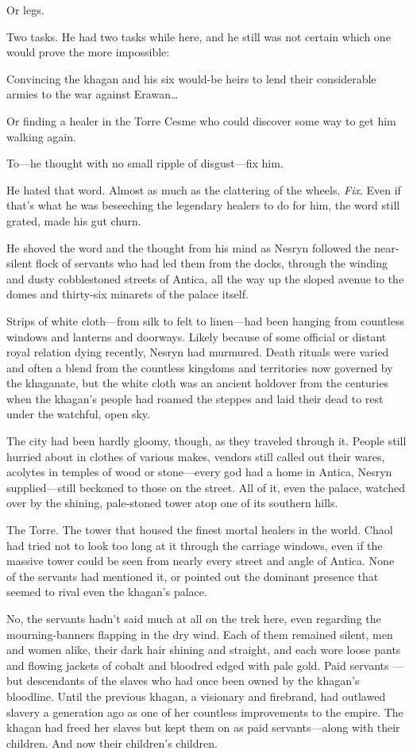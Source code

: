 Or legs.

Two tasks. He had two tasks while here, and he still was not certain which one would prove the more impossible:

Convincing the khagan and his six would-be heirs to lend their considerable armies to the war against Erawan\ldots

Or finding a healer in the Torre Cesme who could discover some way to get him walking again.

To---he thought with no small ripple of disgust---fix him.

He hated that word. Almost as much as the clattering of the wheels. \emph{Fix}. Even if that's what he was beseeching the legendary healers to do for him, the word still grated, made his gut churn.

He shoved the word and the thought from his mind as Nesryn followed the near-silent flock of servants who had led them from the docks, through the winding and dusty cobblestoned streets of Antica, all the way up the sloped avenue to the domes and thirty-six minarets of the palace itself.

Strips of white cloth---from silk to felt to linen---had been hanging from countless windows and lanterns and doorways. Likely because of some official or distant royal relation dying recently, Nesryn had murmured. Death rituals were varied and often a blend from the countless kingdoms and territories now governed by the khaganate, but the white cloth was an ancient holdover from the centuries when the khagan's people had roamed the steppes and laid their dead to rest under the watchful, open sky.

The city had been hardly gloomy, though, as they traveled through it. People still hurried about in clothes of various makes, vendors still called out their wares, acolytes in temples of wood or stone---every god had a home in Antica, Nesryn supplied---still beckoned to those on the street. All of it, even the palace, watched over by the shining, pale-stoned tower atop one of its southern hills.

The Torre. The tower that housed the finest mortal healers in the world. Chaol had tried not to look too long at it through the carriage windows, even if the massive tower could be seen from nearly every street and angle of Antica. None of the servants had mentioned it, or pointed out the dominant presence that seemed to rival even the khagan's palace.

No, the servants hadn't said much at all on the trek here, even regarding the mourning-banners flapping in the dry wind. Each of them remained silent, men and women alike, their dark hair shining and straight, and each wore loose pants and flowing jackets of cobalt and bloodred edged with pale gold. Paid servants ---but descendants of the slaves who had once been owned by the khagan's bloodline. Until the previous khagan, a visionary and firebrand, had outlawed slavery a generation ago as one of her countless improvements to the empire. The khagan had freed her slaves but kept them on as paid servants---along with their children. And now their children's children.

